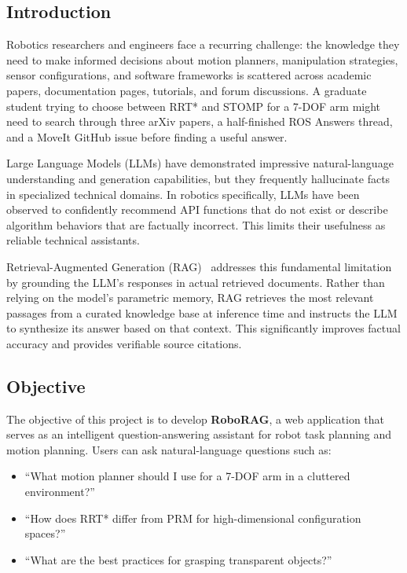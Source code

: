 \documentclass[12pt, a4paper]{article}
\begin{document}
\subsection{Introduction}

Robotics researchers and engineers face a recurring challenge: the knowledge they need to make informed decisions about motion planners, manipulation strategies, sensor configurations, and software frameworks is scattered across academic papers, documentation pages, tutorials, and forum discussions. A graduate student trying to choose between RRT* and STOMP for a 7-DOF arm might need to search through three arXiv papers, a half-finished ROS Answers thread, and a MoveIt GitHub issue before finding a useful answer.

Large Language Models (LLMs) have demonstrated impressive natural-language understanding and generation capabilities, but they frequently hallucinate facts in specialized technical domains. In robotics specifically, LLMs have been observed to confidently recommend API functions that do not exist or describe algorithm behaviors that are factually incorrect. This limits their usefulness as reliable technical assistants.

Retrieval-Augmented Generation (RAG)~\cite{lewis2020rag} addresses this fundamental limitation by grounding the LLM's responses in actual retrieved documents. Rather than relying on the model's parametric memory, RAG retrieves the most relevant passages from a curated knowledge base at inference time and instructs the LLM to synthesize its answer based on that context. This significantly improves factual accuracy and provides verifiable source citations.

\subsection{Objective}

The objective of this project is to develop \textbf{RoboRAG}, a web application that serves as an intelligent question-answering assistant for robot task planning and motion planning. Users can ask natural-language questions such as:

\begin{itemize}[nosep]
    \item ``What motion planner should I use for a 7-DOF arm in a cluttered environment?''
    \item ``How does RRT* differ from PRM for high-dimensional configuration spaces?''
    \item ``What are the best practices for grasping transparent objects?''
\end{itemize}
\end{document}
